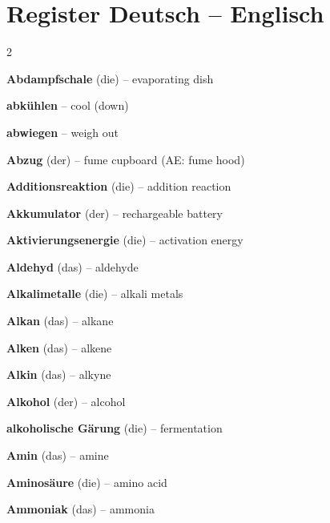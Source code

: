 \newpage
\section{Register Deutsch -- Englisch}
\begin{multicols}{2}\small\raggedright

\par\nopagebreak
\textbf{Abdampfschale} (die) -- evaporating dish\dotfill\hyperref[e:48]{\pageref*{e:48}}\par
\textbf{abkühlen} -- cool (down)\dotfill\hyperref[e:71]{\pageref*{e:71}}\par
\textbf{abwiegen} -- weigh out\dotfill\hyperref[e:69]{\pageref*{e:69}}\par
\textbf{Abzug} (der) -- fume cupboard (AE: fume hood)\dotfill\hyperref[e:63]{\pageref*{e:63}}\par
\textbf{Additionsreaktion} (die) -- addition reaction\dotfill\hyperref[e:228]{\pageref*{e:228}}\par
\textbf{Akkumulator} (der) -- rechargeable battery\dotfill\hyperref[e:204]{\pageref*{e:204}}\par
\textbf{Aktivierungsenergie} (die) -- activation energy\dotfill\hyperref[e:141]{\pageref*{e:141}}\par
\textbf{Aldehyd} (das) -- aldehyde\dotfill\hyperref[e:221]{\pageref*{e:221}}\par
\textbf{Alkalimetalle} (die) -- alkali metals\dotfill\hyperref[e:88]{\pageref*{e:88}}\par
\textbf{Alkan} (das) -- alkane\dotfill\hyperref[e:210]{\pageref*{e:210}}\par
\textbf{Alken} (das) -- alkene\dotfill\hyperref[e:211]{\pageref*{e:211}}\par
\textbf{Alkin} (das) -- alkyne\dotfill\hyperref[e:212]{\pageref*{e:212}}\par
\textbf{Alkohol} (der) -- alcohol\dotfill\hyperref[e:219]{\pageref*{e:219}}\par
\textbf{alkoholische Gärung} (die) -- fermentation\dotfill\hyperref[e:247]{\pageref*{e:247}}\par
\textbf{Amin} (das) -- amine\dotfill\hyperref[e:226]{\pageref*{e:226}}\par
\textbf{Aminosäure} (die) -- amino acid\dotfill\hyperref[e:227]{\pageref*{e:227}}\par
\textbf{Ammoniak} (das) -- ammonia\dotfill\hyperref[e:182]{\pageref*{e:182}}\par

\end{multicols}
